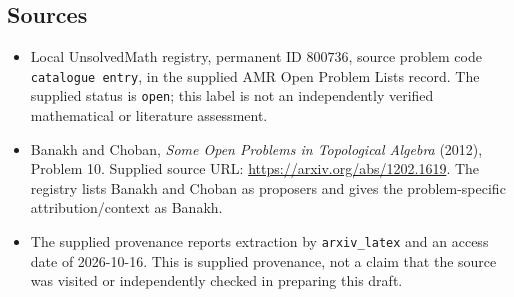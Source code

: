 \documentclass[11pt]{article}
\begin{document}
\subsection{Sources}
\begin{itemize}
\item Local UnsolvedMath registry, permanent ID \(800736\), source problem code \texttt{catalogue entry}, in the supplied AMR Open Problem Lists record. The supplied status is \texttt{open}; this label is not an independently verified mathematical or literature assessment.
\item Banakh and Choban, \emph{Some Open Problems in Topological Algebra} (2012), Problem 10. Supplied source URL: \url{https://arxiv.org/abs/1202.1619}. The registry lists Banakh and Choban as proposers and gives the problem-specific attribution/context as Banakh.
\item The supplied provenance reports extraction by \texttt{arxiv\_latex} and an access date of 2026-10-16. This is supplied provenance, not a claim that the source was visited or independently checked in preparing this draft.
\end{itemize}
\end{document}
